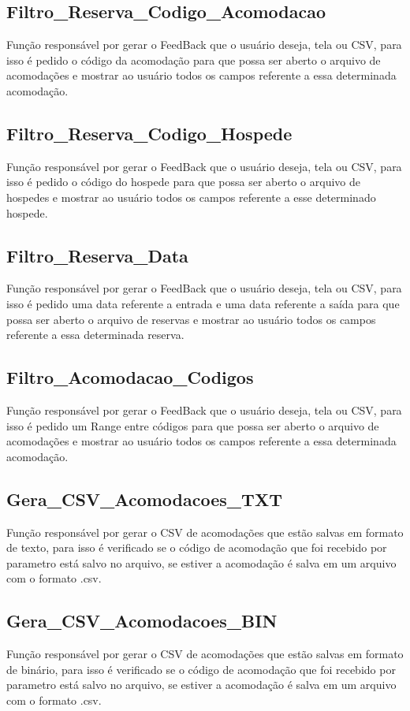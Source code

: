 \documentclass{article}
\begin{document}
\subsection{Filtro\_Reserva\_Codigo\_Acomodacao}
	Função responsável por gerar o FeedBack que o usuário deseja, tela ou CSV, para isso é pedido o código da acomodação para que possa ser aberto o arquivo de acomodações e mostrar ao usuário todos os campos referente a essa determinada acomodação.

\subsection{Filtro\_Reserva\_Codigo\_Hospede}
	Função responsável por gerar o FeedBack que o usuário deseja, tela ou CSV, para isso é pedido o código do hospede para que possa ser aberto o arquivo de hospedes e mostrar ao usuário todos os campos referente a esse determinado hospede.


\subsection{Filtro\_Reserva\_Data}
	Função responsável por gerar o FeedBack que o usuário deseja, tela ou CSV, para isso é pedido uma data referente a entrada e uma data referente a saída para que possa ser aberto o arquivo de reservas e mostrar ao usuário todos os campos referente a essa determinada reserva.

\subsection{Filtro\_Acomodacao\_Codigos}
	Função responsável por gerar o FeedBack que o usuário deseja, tela ou CSV, para isso é pedido um Range entre códigos para que possa ser aberto o arquivo de acomodações e mostrar ao usuário todos os campos referente a essa determinada acomodação.
	
\subsection{Gera\_CSV\_Acomodacoes\_TXT}
	Função responsável por gerar o CSV de acomodações que estão salvas em formato de texto, para isso é verificado se o código de acomodação que foi recebido por parametro está salvo no arquivo, se estiver a acomodação é salva em um arquivo com o formato .csv.	
	
\subsection{Gera\_CSV\_Acomodacoes\_BIN}
	Função responsável por gerar o CSV de acomodações que estão salvas em formato de binário, para isso é verificado se o código de acomodação que foi recebido por parametro está salvo no arquivo, se estiver a acomodação é salva em um arquivo com o formato .csv.
\end{document}

